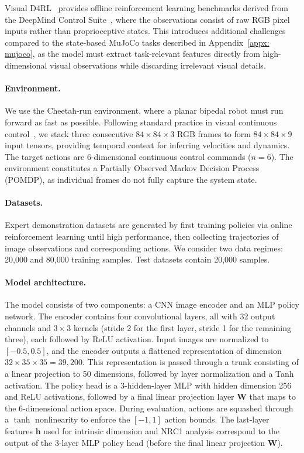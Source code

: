 Visual D4RL~\citep{lu2023vd4rl} provides offline reinforcement learning benchmarks derived from the DeepMind Control Suite~\citep{tassa2018deepmindcontrolsuite}, where the observations consist of raw RGB pixel inputs rather than proprioceptive states. This introduces additional challenges compared to the state-based MuJoCo tasks described in Appendix~\ref{appx: mujoco}, as the model must extract task-relevant features directly from high-dimensional visual observations while discarding irrelevant visual details.
 
\paragraph{Environment.} We use the Cheetah-run environment, where a planar bipedal robot must run forward as fast as possible. Following standard practice in visual continuous control~\citep{yarats2022drq_v2}, we stack three consecutive $84 \times 84 \times 3$ RGB frames to form $84 \times 84 \times 9$ input tensors, providing temporal context for inferring velocities and dynamics. The target actions are 6-dimensional continuous control commands ($n = 6$). The environment constitutes a Partially Observed Markov Decision Process (POMDP), as individual frames do not fully capture the system state.
 
\paragraph{Datasets.} Expert demonstration datasets are generated by first training policies via online reinforcement learning until high performance, then collecting trajectories of image observations and corresponding actions. We consider two data regimes: 20,000 and 80,000 training samples. Test datasets contain 20,000 samples.
 
\paragraph{Model architecture.} The model consists of two components: a CNN image encoder and an MLP policy network. The encoder contains four convolutional layers, all with 32 output channels and $3 \times 3$ kernels (stride 2 for the first layer, stride 1 for the remaining three), each followed by ReLU activation. Input images are normalized to $[-0.5, 0.5]$, and the encoder outputs a flattened representation of dimension $32 \times 35 \times 35 = 39{,}200$. This representation is passed through a trunk consisting of a linear projection to 50 dimensions, followed by layer normalization and a Tanh activation. The policy head is a 3-hidden-layer MLP with hidden dimension 256 and ReLU activations, followed by a final linear projection layer $\mathbf{W}$ that maps to the 6-dimensional action space. During evaluation, actions are squashed through a $\tanh$ nonlinearity to enforce the $[-1, 1]$ action bounds. The last-layer features $\mathbf{h}$ used for intrinsic dimension and NRC1 analysis correspond to the output of the 3-layer MLP policy head (before the final linear projection $\mathbf{W}$).
 
